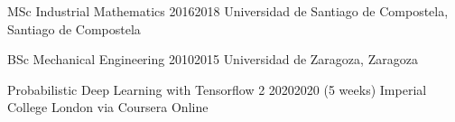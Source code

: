 \cvitem
{MSc Industrial Mathematics} %
{2016}{2018} %
{Universidad de Santiago de Compostela,} %
{Santiago de Compostela} %

\vspace{10pt}
\cvitem
{BSc Mechanical Engineering} %
{2010}{2015} %
{Universidad de Zaragoza,} %
{Zaragoza} %

\vspace{12pt}
\cvitem
{Probabilistic Deep Learning with Tensorflow 2} %
{2020}{2020 (5 weeks)} %
{Imperial College London via Coursera} %
{Online} %